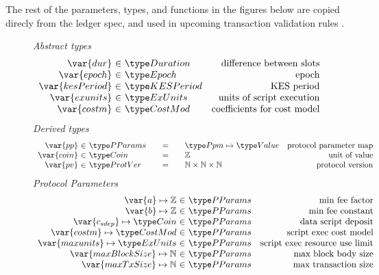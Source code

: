 The rest of the parameters, types, and functions in the figures below are copied
direcly from the ledger spec,
and used in upcoming transaction validation rules .


\begin{figure*}[htb]
  \emph{Abstract types}
  \begin{equation*}
    \begin{array}{r@{~\in~}lr}
      \var{dur} & \Duration & \text{difference between slots}\\
      \var{epoch} & \Epoch & \text{epoch} \\
      \var{kesPeriod} & \KESPeriod & \text{KES period} \\
      \var{exunits} & \ExUnits & \text{units of script execution} \\
      \var{costm} & \CostMod & \text{coefficients for cost model} \\
    \end{array}
  \end{equation*}
  \emph{Derived types}
  \begin{equation*}
    \begin{array}{r@{~\in~}l@{\qquad=\qquad}lr}
      \var{pp}
      & \PParams
      & \Ppm \mapsto \Value
      & \text{protocol parameter map}
      \\
      \var{coin}
      & \Coin
      & \Z
      & \text{unit of value}
      \\
      \var{pv}
      & \ProtVer
      & \N\times\N\times\N
      & \text{protocol version}
    \end{array}
  \end{equation*}
  \emph{Protocol Parameters}
  \begin{equation*}
      \begin{array}{r@{~\in~}lr}
        \var{a} \mapsto \Z & \PParams & \text{min fee factor}\\
        \var{b} \mapsto \Z & \PParams & \text{min fee constant}\\
        \var{c_{sdep}} \mapsto \Coin & \PParams & \text{data script deposit}\\
        \var{costm} \mapsto \CostMod & \PParams & \text{script exec cost model}\\
        \var{maxunits} \mapsto \ExUnits & \PParams & \text{script exec resource use limit}\\
        \var{maxBlockSize} \mapsto \N & \PParams & \text{max block body size}\\
        \var{maxTxSize} \mapsto \N & \PParams & \text{max transaction size}\\

\end{array}
\end{equation*}
\end{figure*}
